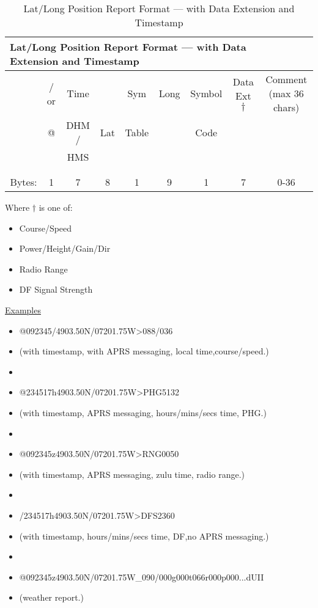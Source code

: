 \begin{table}[H]
  \begin{tabular}{r|c|c|c|c|c|c|c|c|}
    \hline
    \multicolumn{8}{l}{Lat/Long Position Report Format — with Data Extension and Timestamp} \\
    \hline 
    & / or & Time    &     & Sym    & Long & Symbol & Data Ext $\dagger$ & Comment (max 36 chars) \\
    & @    & DHM /   & Lat & Table  &      & Code   &       & \\
    &      & HMS     &     &        &      &        &       & \\
    &      &         &     &        &      &        &       & \\
    &      &         &     &        &      &        &       & \\
    \hline
    Bytes: & 1 & 7 & 8 & 1 & 9 & 1 & 7 & 0-36  \\
    \hline
        
  \end{tabular}
  \vspace{2em}
  
  Where $\dagger$ is one of:
  \begin{itemize}
  \item Course/Speed
  \item Power/Height/Gain/Dir
  \item Radio Range
  \item DF Signal Strength
  \end{itemize}

  \vspace {2em}
  
  \underline{Examples}
  \vspace{1em}
  
  \begin{itemize}
  \item[] @092345/4903.50N/07201.75W>088/036
  \item (with timestamp, with APRS messaging, local time,course/speed.)
  \item[]
  \item[] @234517h4903.50N/07201.75W>PHG5132
  \item (with timestamp, APRS messaging, hours/mins/secs time, PHG.)
  \item[]
  \item[] @092345z4903.50N/07201.75W>RNG0050
  \item (with timestamp, APRS messaging, zulu time, radio range.)
  \item[]
  \item[] /234517h4903.50N/07201.75W>DFS2360
  \item (with timestamp, hours/mins/secs time, DF,no APRS messaging.)
  \item[]
  \item[] @092345z4903.50N/07201.75W\_090/000g000t066r000p000...dUII
  \item[] (weather report.)
  \end{itemize}

  \doublerule
  
  \caption{Lat/Long Position Report Format — with Data Extension and Timestamp}
\end{table}


